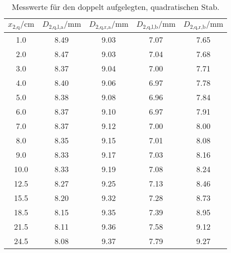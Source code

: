 \begin{table}[h]
  \centering
  \caption{Messwerte für den doppelt aufgelegten, quadratischen Stab.}
  \label{tab:Quadzwei}
  \begin{tabular}{c c c c c}
    \toprule
    $x_\text{2,q}/\si{\centi\meter}$ & $D_\text{2,q,l,a}/\si{\milli\meter}$ &
    $D_\text{2,q,r,a}/\si{\milli\meter}$ & $D_\text{2,q,l,b}/\si{\milli\meter}$
    & $D_\text{2,q,r,b}/\si{\milli\meter}$\\
    \midrule
    1.0 & 8.49 & 9.03 & 7.07 & 7.65 \\
    2.0 & 8.47 & 9.03 & 7.04 & 7.68 \\
    3.0 & 8.37 & 9.04 & 7.00 & 7.71 \\
    4.0 & 8.40 & 9.06 & 6.97 & 7.78 \\
    5.0 & 8.38 & 9.08 & 6.96 & 7.84 \\
    6.0 & 8.37 & 9.10 & 6.97 & 7.91 \\
    7.0 & 8.37 & 9.12 & 7.00 & 8.00 \\
    8.0 & 8.35 & 9.15 & 7.01 & 8.08 \\
    9.0 & 8.33 & 9.17 & 7.03 & 8.16 \\
    10.0 & 8.33 & 9.19 & 7.08 & 8.24 \\
    12.5 & 8.27 & 9.25 & 7.13 & 8.46 \\
    15.5 & 8.20 & 9.32 & 7.28 & 8.73 \\
    18.5 & 8.15 & 9.35 & 7.39 & 8.95 \\
    21.5 & 8.11 & 9.36 & 7.58 & 9.12 \\
    24.5 & 8.08 & 9.37 & 7.79 & 9.27 \\
    \bottomrule
  \end{tabular}
\end{table}
